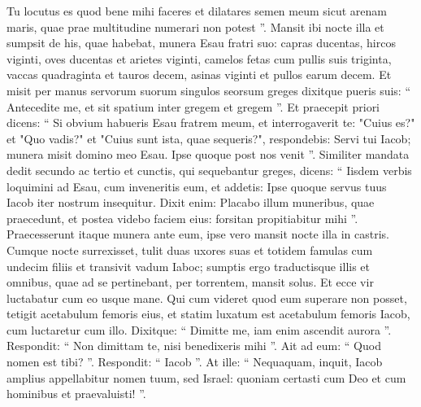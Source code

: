\begin{biblechapter}
\begin{biblechapter}
\begin{biblechapter}
\begin{biblechapter}
\begin{biblechapter}
\begin{biblechapter}
\begin{biblechapter}
\begin{biblechapter}
\begin{biblechapter}
\begin{biblechapter}
\begin{biblechapter}
\begin{biblechapter}
\begin{biblechapter}
\begin{biblechapter}
\begin{biblechapter}
\begin{biblechapter}
\begin{biblechapter}
\begin{biblechapter}
\begin{biblechapter}
\begin{biblechapter}
\begin{biblechapter}
\begin{biblechapter}
\begin{biblechapter}
\begin{biblechapter}
\begin{biblechapter}
\begin{biblechapter}
\begin{biblechapter}
\begin{biblechapter}
\begin{biblechapter}
\begin{biblechapter}
\begin{biblechapter}
\begin{biblechapter}
\verse Tu locutus es quod bene mihi faceres et dilatares semen meum sicut arenam maris, quae prae multitudine numerari non potest ”.
 \verse Mansit ibi nocte illa et sumpsit de his, quae habebat, munera Esau fratri suo: 
\verse capras ducentas, hircos viginti, oves ducentas et arietes viginti, 
 \verse camelos fetas cum pullis suis triginta, vaccas quadraginta et tauros decem, asinas viginti et pullos earum decem. 
\verse Et misit per manus servorum suorum singulos seorsum greges dixitque pueris suis: “ Antecedite me, et sit spatium inter gregem et gregem ”.
 \verse Et praecepit priori dicens: “ Si obvium habueris Esau fratrem meum, et interrogaverit te: "Cuius es?" et "Quo vadis?" et "Cuius sunt ista, quae sequeris?", 
\verse respondebis: Servi tui Iacob; munera misit domino meo Esau. Ipse quoque post nos venit ”.
 \verse Similiter mandata dedit secundo ac tertio et cunctis, qui sequebantur greges, dicens: “ Iisdem verbis loquimini ad Esau, cum inveneritis eum, 
\verse et addetis: Ipse quoque servus tuus Iacob iter nostrum insequitur. Dixit enim: Placabo illum muneribus, quae praecedunt, et postea videbo faciem eius: forsitan propitiabitur mihi ”.
 \verse Praecesserunt itaque munera ante eum, ipse vero mansit nocte illa in castris.
 \verse Cumque nocte surrexisset, tulit duas uxores suas et totidem famulas cum undecim filiis et transivit vadum Iaboc; 
\verse sumptis ergo traductisque illis et omnibus, quae ad se pertinebant, per torrentem, 
\verse mansit solus.
 Et ecce vir luctabatur cum eo usque mane. 
\verse Qui cum videret quod eum superare non posset, tetigit acetabulum femoris eius, et statim luxatum est acetabulum femoris Iacob, cum luctaretur cum illo. 
\verse Dixitque: “ Dimitte me, iam enim ascendit aurora ”. Respondit: “ Non dimittam te, nisi benedixeris mihi ”. 
\verse Ait ad eum: “ Quod nomen est tibi? ”. Respondit: “ Iacob ”. 
\verse At ille: “ Nequaquam, inquit, Iacob amplius appellabitur nomen tuum, sed Israel: quoniam certasti cum Deo et cum hominibus et praevaluisti! ”. 

\end{biblechapter}
\end{biblechapter}
\end{biblechapter}
\end{biblechapter}
\end{biblechapter}
\end{biblechapter}
\end{biblechapter}
\end{biblechapter}
\end{biblechapter}
\end{biblechapter}
\end{biblechapter}
\end{biblechapter}
\end{biblechapter}
\end{biblechapter}
\end{biblechapter}
\end{biblechapter}
\end{biblechapter}
\end{biblechapter}
\end{biblechapter}
\end{biblechapter}
\end{biblechapter}
\end{biblechapter}
\end{biblechapter}
\end{biblechapter}
\end{biblechapter}
\end{biblechapter}
\end{biblechapter}
\end{biblechapter}
\end{biblechapter}
\end{biblechapter}
\end{biblechapter}
\end{biblechapter}
